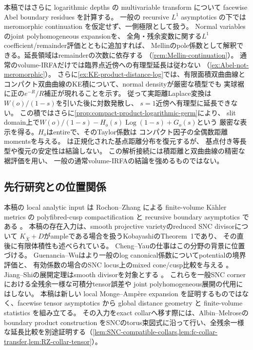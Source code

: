 \documentclass[11pt,a4paper]{ltjsarticle}
\newcommand{\ov}{\overline}
\theoremstyle{plain}
\theoremstyle{definition}
\theoremstyle{remark}
\begin{document}
本稿ではさらに logarithmic depths の multivariable transform について facewise Abel boundary residues を計算する。
一般の recursive $L^1$ asymptotics の下では meromorphic continuation を仮定せず、一側極限として扱う。
Normal variablesのjoint polyhomogeneous expansionを、
全角・残余変数に関する$L^1$ coefficient/remainder評価とともに追加すれば、
Mellinのpole係数として解釈できる。延長領域はremainderの次数に依存する
（\cref{rem:Mellin-continuation}）。
通常のvolume-IRFAだけでは臨界点近傍への有理型延長は従わない
（\cref{ex:Abel-not-meromorphic}）。
さらに\cref{ex:KE-product-distance-log}では、有限面積双曲曲線と
コンパクト双曲曲線のKE積について、normal densityが厳密な積型でも
実球裾に正の$e^{-R}/R$補正が現れることを示す。
従って実距離Laplace変換は$W(o)/(1-s)$を引いた後に対数発散し、
$s=1$近傍へ有理型に延長できない。
この積ではさらに\cref{prop:compact-product-logarithmic-germ}により、
slit domain上で$W(o)/(1-s)-H_o(s)\operatorname{Log}(1-s)+G_o(s)$という
厳密な表示を得る。$H_o$はentireで、そのTaylor係数は
コンパクト因子の全偶数距離momentsを与える。
は正規化された基点距離分布を復元するが、
基点付き等長型や復元の安定性は結論しない。
この解析接続には積距離と双曲曲線の精密な裾評価を用い、
一般の通常volume-IRFAの結論を強めるものではない。

\subsection{先行研究との位置関係}
本稿の local analytic input は Rochon--Zhang による finite-volume K\"ahler metrics の polyfibred-cusp compactification と recursive boundary asymptotics である \cite{RochonZhang}。
本稿の存在入力は、smooth projective varietyのreduced SNC divisorについて
$K_{\ov X}+D$がampleである場合を扱うKobayashiのTheorem~1であり、
その直後に有限体積性も述べられている\cite[pp.~399--400]{Kobayashi}。
Cheng--Yauの仕事\cite{ChengYau}はこの分野の背景に位置づける。
Guenancia--Wuはより一般のlog canonical係数についてpotentialの境界評価と、
有効係数の場合のSNC locus上のmixed cone/cusp比較を与える
\cite[Theorems~A--B]{GuenanciaWu}。
Jiang--Shiの展開定理はsmooth divisorを対象とする
\cite[Theorem~1.1]{JiangShi}。
これらを一般SNC cornerにおける全残余一様な可積分tensor誤差や
joint polyhomogeneous展開の代用にはしない。
本稿は新しい local Monge--Amp\`ere expansion を証明するものではなく、facewise tensor asymptotics から global distance geometry と finite-volume statistics を組み立てる。
その入力をexact collarへ移す際には、Albin--Melroseのboundary product construction \cite[Proposition~1.2]{AlbinMelrose}をSNCのtorus束図式に沿って行い、全残余一様な延長比較を別途証明する（\cref{lem:SNC-compatible-collars,lem:fc-collar-transfer,lem:RZ-collar-tensor}）。
\end{document}

